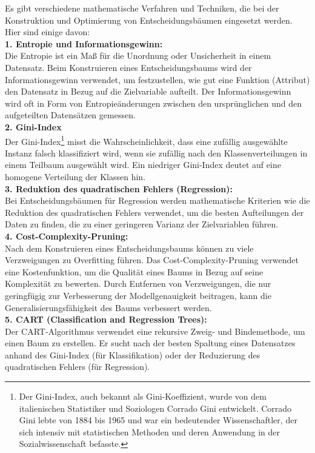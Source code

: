 \documentclass[12pt]{article}
\begin{document}
Es gibt verschiedene mathematische Verfahren und Techniken, die bei der Konstruktion und Optimierung von Entscheidungsbäumen eingesetzt werden. Hier sind einige davon:\\[0.2cm]
%
\textbf{1. Entropie und Informationsgewinn:}\\
Die Entropie ist ein Maß für die Unordnung oder Unsicherheit in einem Datensatz. Beim Konstruieren eines Entscheidungsbaums wird der Informationsgewinn verwendet, um festzustellen, wie gut eine Funktion (Attribut) den Datensatz in Bezug auf die Zielvariable aufteilt. Der Informationsgewinn wird oft in Form von Entropieänderungen zwischen den ursprünglichen und den aufgeteilten Datensätzen gemessen.\\[0.2cm]
%
\textbf{2. Gini-Index}\\
Der Gini-Index\footnote{Der Gini-Index, auch bekannt als Gini-Koeffizient, wurde von dem italienischen Statistiker und Soziologen Corrado Gini entwickelt. Corrado Gini lebte von 1884 bis 1965 und war ein bedeutender Wissenschaftler, der sich intensiv mit statistischen Methoden und deren Anwendung in der Sozialwissenschaft befasste.} misst die Wahrscheinlichkeit, dass eine zufällig ausgewählte Instanz falsch klassifiziert wird, wenn sie zufällig nach den Klassenverteilungen in einem Teilbaum ausgewählt wird. Ein niedriger Gini-Index deutet auf eine homogene Verteilung der Klassen hin.\\[0.2cm]
%
\textbf{3. Reduktion des quadratischen Fehlers (Regression):}\\
Bei Entscheidungsbäumen für Regression werden mathematische Kriterien wie die Reduktion des quadratischen Fehlers verwendet, um die besten Aufteilungen der Daten zu finden, die zu einer geringeren Varianz der Zielvariablen führen.\\[0.2cm]
%
\textbf{4. Cost-Complexity-Pruning:}\\
Nach dem Konstruieren eines Entscheidungsbaums können zu viele Verzweigungen zu Overfitting führen. Das Cost-Complexity-Pruning verwendet eine Kostenfunktion, um die Qualität eines Baums in Bezug auf seine Komplexität zu bewerten. Durch Entfernen von Verzweigungen, die nur geringfügig zur Verbesserung der Modellgenauigkeit beitragen, kann die Generalisierungsfähigkeit des Baums verbessert werden.\\[0.2cm]
%
\textbf{5. CART (Classification and Regression Trees):}\\
Der CART-Algorithmus verwendet eine rekursive Zweig- und Bindemethode, um einen Baum zu erstellen. Er sucht nach der besten Spaltung eines Datensatzes anhand des Gini-Index (für Klassifikation) oder der Reduzierung des quadratischen Fehlers (für Regression).\\[0.2cm]
\end{document}
